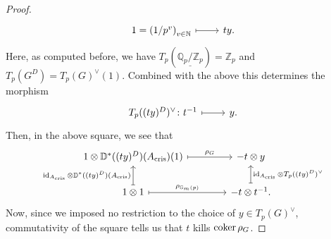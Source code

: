 \begin{proof}
\begin{equation*}
\begin{tikzcd}[row sep = 0ex
		,/tikz/column 1/.append style={anchor=base east}
		,/tikz/column 2/.append style={anchor=base west}]
		1 = \left( 1/p^v \right)_{v \in \mathbb{N}}
		\arrow[r, "", mapsto] &
		ty
	.\end{tikzcd}
	\end{equation*} 
	Here, as computed before, we have $T_p ( \underline{\mathbb{Q}_p/\mathbb{Z}_{p}} ) =
	\mathbb{Z}_{p}$ and $T_p(G^D) = T_p(G)^\vee(1)$.
	Combined with the above this determines the morphism
	\begin{equation*}
	\begin{tikzcd}[row sep = 0ex
		,/tikz/column 1/.append style={anchor=base east}
		,/tikz/column 2/.append style={anchor=base west}]
		T_p((ty)^D)^\vee\colon 
		t^{-1}
		\arrow[r, "", mapsto] &
		y
	.\end{tikzcd}
	\end{equation*}
	Then, in the above square, we see that
	\begin{equation*}
	\begin{tikzcd}[column sep=4em]
		1 \otimes \mathbb{D}^*((ty)^D)(A_{\mathrm{cris}})(1) 
		\arrow[r, "\rho_G", mapsto] &
		-t \otimes y \\
		1 \otimes 1
		\arrow[u, "\id_{ A_{\mathrm{cris}} } \otimes \mathbb{D}^*((ty)^D)(A_{\mathrm{cris}})", mapsto] 
		\arrow[r, "\rho_{\mathbb{G}_m(p)}", mapsto] &
		-t \otimes t^{-1}
		\arrow[u, "\id_{ A_{\mathrm{cris}} } \otimes T_p((ty)^D)^\vee"', mapsto] 
	.\end{tikzcd}
	\end{equation*}
	Now, since we imposed no restriction to the choice of $y \in T_p(G)^\vee$, 
	commutativity of the square tells us that $t$ kills $\operatorname{coker} \rho_G$.


\end{proof}
